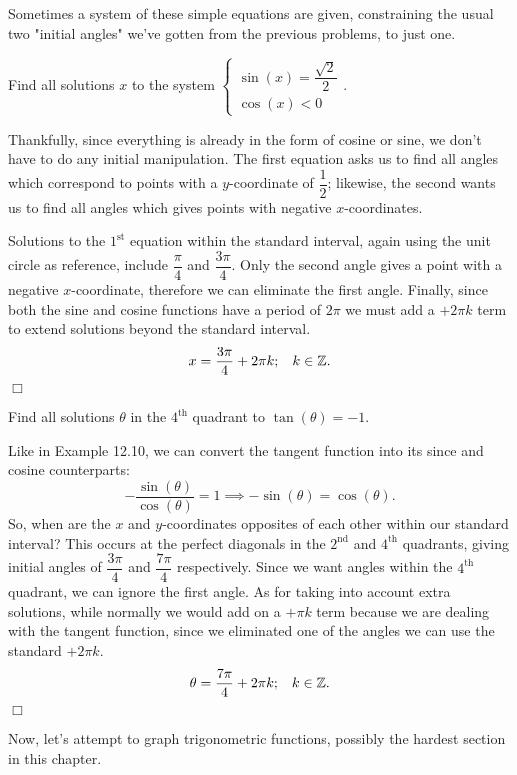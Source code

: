\documentclass[../book.tex]{subfiles}
\begin{document}
Sometimes a system of these simple equations are given, constraining the usual two "initial angles" we've gotten from the previous problems, to just one.
\begin{example}
Find all solutions $x$ to the system $\begin{cases} \sin(x)=\dfrac{\sqrt{2}}{2} \\ \cos(x)<0\end{cases}$.
\end{example}
\begin{solution}
Thankfully, since everything is already in the form of cosine or sine, we don't have to do any initial manipulation. The first equation asks us to find all angles which correspond to points with a $y$-coordinate of $\dfrac{1}{2}$; likewise, the second wants us to find all angles which gives points with negative $x$-coordinates. 

Solutions to the $1^{\text{st}}$ equation within the standard interval, again using the unit circle as reference, include $\dfrac{\pi}{4}$ and $\dfrac{3\pi}{4}$. Only the second angle gives a point with a negative $x$-coordinate, therefore we can eliminate the first angle. Finally, since both the sine and cosine functions have a period of $2\pi$ we must add a $+2\pi k$ term to extend solutions beyond the standard interval. $$x=\dfrac{3\pi}{4}+2\pi k;\hspace{3mm}k\in\mathbb{Z}.$$ $\Box$
\end{solution}
\begin{example}
Find all solutions $\theta$ in the $4^\text{th}$ quadrant to $\tan(\theta)=-1.$
\end{example}
\begin{solution}
Like in Example 12.10, we can convert the tangent function into its since and cosine counterparts: $$-\dfrac{\sin(\theta)}{\cos(\theta)}=1 \implies -\sin(\theta)=\cos(\theta).$$
So, when are the $x$ and $y$-coordinates opposites of each other within our standard interval? This occurs at the perfect diagonals in the $2^\text{nd}$ and $4^\text{th}$ quadrants, giving initial angles of $\dfrac{3\pi}{4}$ and $\dfrac{7\pi}{4}$ respectively. Since we want angles within the $4^\text{th}$ quadrant, we can ignore the first angle. As for taking into account extra solutions, while normally we would add on a $+\pi k$ term because we are dealing with the tangent function, since we eliminated one of the angles we can use the standard $+2\pi k$. $$\theta=\dfrac{7\pi}{4}+2\pi k;\hspace{3mm} k\in\mathbb{Z}.$$ $\Box$
\end{solution}
Now, let's attempt to graph trigonometric functions, possibly the hardest section in this chapter.
\end{document}
